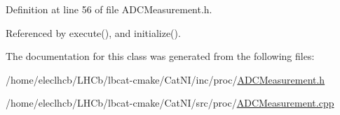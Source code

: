 Definition at line 56 of file A\+D\+C\+Measurement.\+h.



Referenced by execute(), and initialize().



The documentation for this class was generated from the following files\+:\begin{DoxyCompactItemize}
\item 
/home/eleclhcb/\+L\+H\+Cb/lbcat-\/cmake/\+Cat\+N\+I/inc/proc/\hyperlink{ADCMeasurement_8h}{A\+D\+C\+Measurement.\+h}\item 
/home/eleclhcb/\+L\+H\+Cb/lbcat-\/cmake/\+Cat\+N\+I/src/proc/\hyperlink{ADCMeasurement_8cpp}{A\+D\+C\+Measurement.\+cpp}\end{DoxyCompactItemize}
